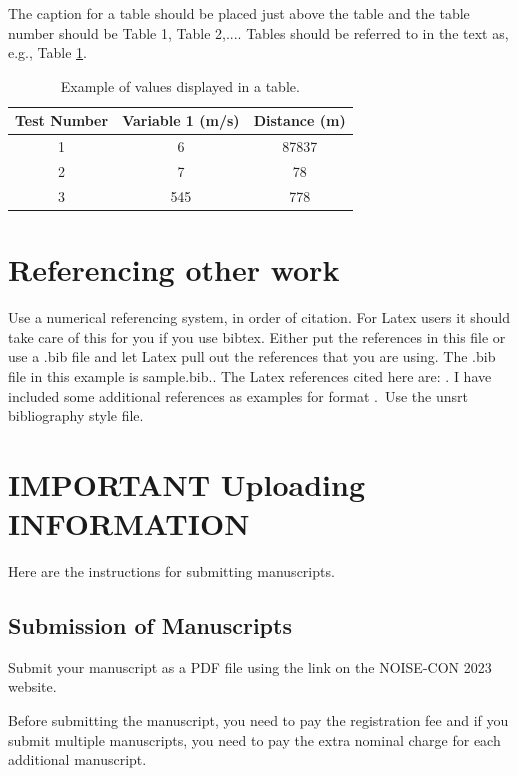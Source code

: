 \documentclass[letterpaper,12pt]{article}
\begin{document}
The caption for a table should be placed just above the table and the table number should be Table 1, Table 2,.... Tables should be referred to in the text as, e.g., Table \ref{Tab:1}.

\begin{table}[h!]

\caption{Example of values displayed in a table.}
\label{Tab:1}

\begin{center}
\begin{tabular}{c c c } 
 \hline
 \textbf{Test Number} &  \textbf{Variable 1 (m/s)}& \textbf{Distance (m)}  \\ [0.5ex] 
 \hline
 1 & 6 & 87837 \\ 
 \hline
 2 & 7 & 78  \\
 \hline
 3 & 545 & 778 \\ [1ex] 
 \hline
\end{tabular}
\end{center}
\end{table}
\section{Referencing other work}
\noindent
Use a numerical referencing system, in order of citation.  For Latex users it should take care of this for you if you use bibtex.   Either put the references in this file or use a .bib file and let Latex pull out the references that you are using.  The .bib file in this example is sample.bib..  The Latex references cited here are:  \cite{latexcompanion, knuthwebsite}.  I have included some additional references as examples for format \cite{Poulsen1, Ryherd2007, Tang2006, May96,  Zwicker_Fastl_2006, ANSI_S3_4}.\ Use the unsrt bibliography style file.  

\section{IMPORTANT Uploading INFORMATION}
\noindent
Here are the instructions for submitting manuscripts. 
\subsection{Submission of Manuscripts}
\noindent
Submit your manuscript as a PDF file using the link on the NOISE-CON 2023 website. 

Before submitting the manuscript, you need to pay the registration fee and if you submit multiple manuscripts, you need to pay the extra nominal charge for each additional manuscript.
\end{document}
